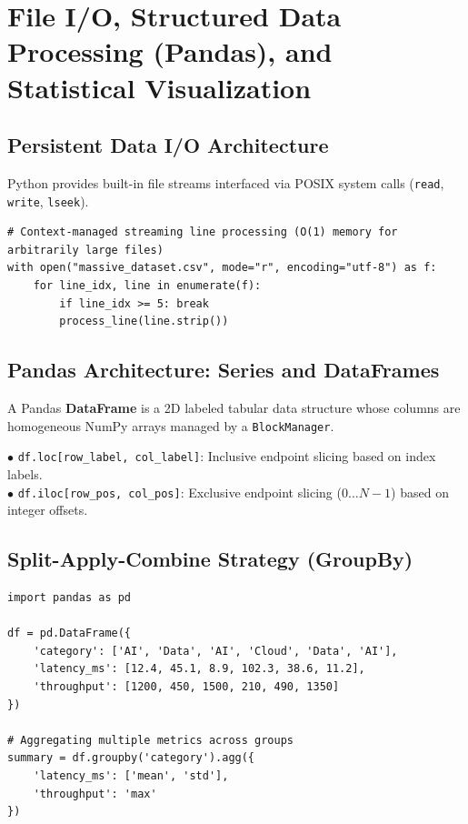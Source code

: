\chapter{File I/O, Structured Data Processing (Pandas), and Statistical Visualization}
\label{chap:files-pandas-viz}

\section{Persistent Data I/O Architecture}
Python provides built-in file streams interfaced via POSIX system calls (\texttt{read}, \texttt{write}, \texttt{lseek}).
\begin{lstlisting}
# Context-managed streaming line processing (O(1) memory for arbitrarily large files)
with open("massive_dataset.csv", mode="r", encoding="utf-8") as f:
    for line_idx, line in enumerate(f):
        if line_idx >= 5: break
        process_line(line.strip())
\end{lstlisting}

\section{Pandas Architecture: Series and DataFrames}
\begin{definition}
A Pandas \textbf{DataFrame} is a 2D labeled tabular data structure whose columns are homogeneous NumPy arrays managed by a \texttt{BlockManager}.
\end{definition}

\begin{keyequation}
$\bullet$ \texttt{df.loc[row\_label, col\_label]}: Inclusive endpoint slicing based on index labels.\\
$\bullet$ \texttt{df.iloc[row\_pos, col\_pos]}: Exclusive endpoint slicing ($0 \dots N-1$) based on integer offsets.
\end{keyequation}

\section{Split-Apply-Combine Strategy (GroupBy)}
\begin{lstlisting}
import pandas as pd

df = pd.DataFrame({
    'category': ['AI', 'Data', 'AI', 'Cloud', 'Data', 'AI'],
    'latency_ms': [12.4, 45.1, 8.9, 102.3, 38.6, 11.2],
    'throughput': [1200, 450, 1500, 210, 490, 1350]
})

# Aggregating multiple metrics across groups
summary = df.groupby('category').agg({
    'latency_ms': ['mean', 'std'],
    'throughput': 'max'
})
\end{lstlisting}

